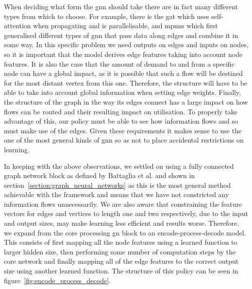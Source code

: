 When deciding what form the \ac{gnn} should take there are in fact many different types from which to choose. For example, there is the \ac{gat}\cite{velivckovic2017graph} which uses self-attention when propagating and is parallelisable, and \acp{mpnn}\cite{gilmer2017neural} which first generalised different types of \ac{gnn} that pass data along edges and combine it in some way. In this specific problem we need outputs on edges and inputs on nodes, so it is important that the model derives edge features taking into account node features. It is also the case that the amount of demand to and from a specific node can have a global impact, as it is possible that such a flow will be destined for the most distant vertex from this one. Therefore, the structure will have to be able to take into account global information when setting edge weights. Finally, the structure of the graph in the way its edges connect has a large impact on how flows can be routed and their resulting impact on utilisation. To properly take advantage of this, our policy must be able to see how information flows and so must make use of the edges. Given these requirements it makes sense to use the one of the most general kinds of \ac{gnn} so as not to place accidental restrictions on learning.

In keeping with the above observations, we settled on using a fully connected graph network block as defined by Battaglia et al.\cite{battaglia2018relational} and shown in section~\ref{section:graph_neural_networks} as this is the most general method achievable with the framework and means that we have not constricted any information flows unnecessarily. We are also aware that constraining the feature vectors for edges and vertices to length one and two respectively, due to the input and output sizes, may make learning less efficient and results worse. Therefore, we expand from the core processing \ac{gn} block to an encode-process-decode model. This consists of first mapping all the node features using a learned function to larger hidden size, then performing some number of computation steps by the core network and finally mapping all of the edge features to the correct output size using another learned function. The structure of this policy can be seen in figure~\ref{fig:encode_process_decode}.

